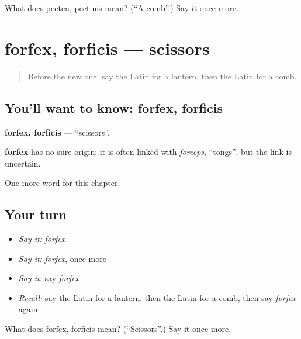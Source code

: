 \begin{tcolorbox}[breakable,colback=teal!4,colframe=teal!35!black,title={Before you move on}]
What does pecten, pectinis mean? (\textquotedblleft{}A comb\textquotedblright{}.) Say it once more.
\end{tcolorbox}
\section[forfex, forficis]{forfex, forficis — scissors}

\label{lesson:LA-C140-forfex}



\begin{quote}
Before the new one: say the Latin for a lantern, then the Latin for a comb.
\end{quote}

\subsection*{You'll want to know: forfex, forficis}
\textbf{forfex, forficis} — \textquotedblleft{}scissors\textquotedblright{}.

\begin{cousinweb}
\textbf{forfex} has no sure origin; it is often linked with \emph{forceps}, \textquotedblleft{}tongs\textquotedblright{}, but the link is uncertain.
\end{cousinweb}

\begin{grammarlens}[title={What you've built}]
One more word for this chapter.
\end{grammarlens}

\subsection*{Your turn}
\begin{itemize}
\raggedright
  \item \emph{Say it:} \emph{forfex}
  \item \emph{Say it:} \emph{forfex}, once more
  \item \emph{Say it:} say \emph{forfex}
  \item \emph{Recall:} say the Latin for a lantern, then the Latin for a comb, then say \emph{forfex} again
\end{itemize}

\begin{tcolorbox}[breakable,colback=teal!4,colframe=teal!35!black,title={Before you move on}]
What does forfex, forficis mean? (\textquotedblleft{}Scissors\textquotedblright{}.) Say it once more.
\end{tcolorbox}
